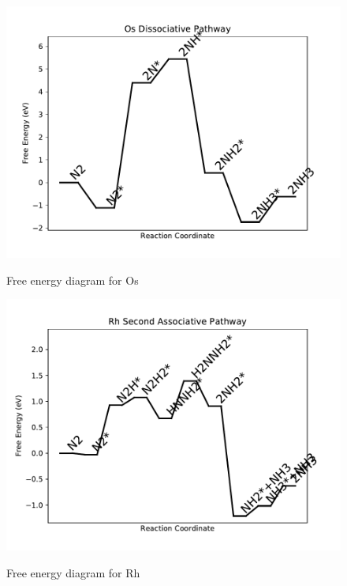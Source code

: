 \documentclass{article}
\begin{document}
\begin{figure}
\includegraphics[width=1\linewidth]{data/plots/Os_dissociative.pdf}
\label{fig:Os_dissociative}
\caption{Free energy diagram for Os}
\end{figure}

\clearpage
\begin{figure}
\includegraphics[width=1\linewidth]{data/plots/Rh_associative_2.pdf}
\label{fig:Rh_associative_2}
\caption{Free energy diagram for Rh}
\end{figure}
\end{document}
